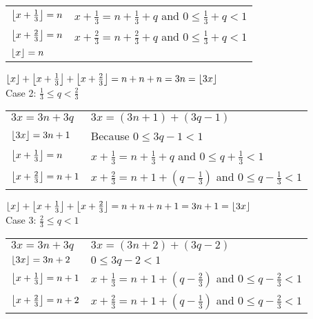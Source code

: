 \documentclass[11pt]{article}
\DeclarePairedDelimiter\floor{\lfloor}{\rfloor}
\begin{document}
\begin{enumerate}
\begin{tabular}{ll}
			$\floor*{x + \frac{1}{3}} = n$ &
			$x+\frac{1}{3} = n + \frac{1}{3} + q$ and
			$0 \leq \frac{1}{3} +q < 1$\\

			$\floor*{x + \frac{2}{3}} = n$ &
			$x+\frac{2}{3} = n + \frac{2}{3} + q$ and
			$0 \leq \frac{1}{3} + q < 1$\\

			$\floor*{x} = n$ \\

		\end{tabular}

		$\floor*{x} + \floor*{x + \frac{1}{3}} +
		\floor*{x + \frac{2}{3}} = n + n + n = 3n =
		\floor*{3x}$ \\

		Case 2: $\frac{1}{3} \leq q < \frac{2}{3}$

		\begin{tabular}{ll}
			$3x = 3n + 3q$ & $3x = (3n + 1) + (3q-1)$\\

			$\floor*{3x} = 3n + 1$ & Because $0 \leq 3q -1<1$\\

			$\floor*{x + \frac{1}{3}} = n$ &
			$x + \frac{1}{3} = n + \frac{1}{3} + q$ and
			$0 \leq q + \frac{1}{3} < 1$ \\

			$\floor*{x + \frac{2}{3} }= n+1$ & $x + \frac{2}{3} = n + 1 + (q-\frac{1}{3} )$
			and $0 \leq q - \frac{1}{3} < 1$ \\

		\end{tabular}

		$\floor*{x} + \floor*{x + \frac{1}{3} } +
		\floor*{x + \frac{2}{3} } = n + n + n + 1 = 3n + 1
		= \floor*{3x}$ \\

		Case 3: $\frac{2}{3} \leq q < 1$

		\begin{tabular}{ll}
			$3x = 3n + 3q$ & $3x = (3n + 2)+(3q - 2)$\\

			$\floor*{3x} = 3n + 2$ & $0 \leq 3q-2 < 1$\\

			$\floor*{x + \frac{1}{3}} = n + 1$ &
			$x + \frac{1}{3} = n+1+ (q-\frac{2}{3})$ and
			$0 \leq q - \frac{2}{3} < 1$ \\


			$\floor*{x + \frac{2}{3}} = n + 2$ &
			$x + \frac{2}{3} = n+1+ (q-\frac{1}{3})$ and
			$0 \leq q - \frac{2}{3} < 1$ \\


\end{tabular}
\end{enumerate}
\end{document}
